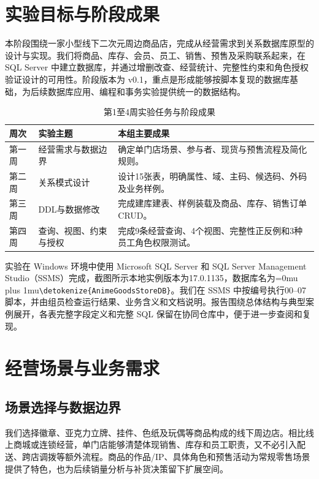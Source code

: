 \documentclass{SYSUReport}
\date{2026年10月4日}
\newcommand{\code}[1]{\begingroup\Urlmuskip=0mu plus 1mu\expandafter\nolinkurl\expandafter{\detokenize{#1}}\endgroup}
\begin{document}
\hypersetup{pageanchor=false}
\cover
\thispagestyle{empty}
\clearpage
{}
\setcounter{page}{1}
\hypersetup{pageanchor=true}
\begingroup\small\setlength{\parskip}{0pt}\tableofcontents\endgroup
\clearpage
{}
\setcounter{page}{1}

\section{实验目标与阶段成果}
本阶段围绕一家小型线下二次元周边商品店，完成从经营需求到关系数据库原型的设计与实现。我们将商品、库存、会员、员工、销售、预售及采购联系起来，在 SQL Server 中建立数据库，并通过增删改查、经营统计、完整性约束和角色授权验证设计的可用性。阶段版本为 v0.1，重点是形成能够按脚本复现的数据库基础，为后续数据库应用、编程和事务实验提供统一的数据结构。

\begin{table}[htbp]
\centering\small
\begin{tabularx}{\textwidth}{P{1.3cm}P{3.1cm}Y}
\toprule 周次 & 实验主题 & 本组主要成果 \\
\midrule
第一周 & 经营需求与数据边界 & 确定单门店场景、参与者、现货与预售流程及简化规则。\\
第二周 & 关系模式设计 & 设计15张表，明确属性、域、主码、候选码、外码及业务样例。\\
第三周 & DDL与数据修改 & 完成建库建表、样例装载及商品、库存、销售订单 CRUD。\\
第四周 & 查询、视图、约束与授权 & 完成9条经营查询、4个视图、完整性正反例和3种员工角色权限测试。\\
\bottomrule
\end{tabularx}
\caption{第1至4周实验任务与阶段成果}
\end{table}

实验在 Windows 环境中使用 Microsoft SQL Server 和 SQL Server Management Studio（SSMS）完成，截图所示本地实例版本为17.0.1135，数据库名为\code{AnimeGoodsStoreDB}。我们在 SSMS 中按编号执行00--07脚本，并由组员检查运行结果、业务含义和文档说明。报告围绕总体结构与典型案例展开，各表完整字段定义和完整 SQL 保留在协同仓库中，便于进一步查阅和复现。

\section{经营场景与业务需求}
\subsection{场景选择与数据边界}
我们选择徽章、亚克力立牌、挂件、色纸及玩偶等商品构成的线下周边店。相比线上商城或连锁经营，单门店能够清楚体现销售、库存和员工职责，又不必引入配送、跨店调拨等额外流程。商品的作品/IP、具体角色和预售活动为常规零售场景提供了特色，也为后续销量分析与补货决策留下扩展空间。
\end{document}
